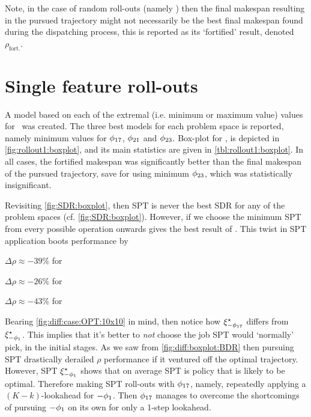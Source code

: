 Note, in the case of random roll-outs (namely \phiRNDRelated) then the final makespan resulting in the pursued trajectory might not necessarily be the best final makespan found during the dispatching process, this is reported as its `fortified' result, denoted $\rho_{\text{fort.}}$. 

\section{Single feature roll-outs}

A model based on each of the extremal (i.e. minimum or maximum value) values 
for \phiGlobalRelated\ was created. The three best models for each problem 
space is reported, namely minimum values for $\phi_{17}$, $\phi_{21}$ and 
$\phi_{23}$. 
Box-plot for \namerho, is depicted in \cref{fig:rollout1:boxplot}, and its 
main statistics are given in \cref{tbl:rollout1:boxplot}.
In all cases, the fortified makespan was significantly better than the final 
makespan of the pursued trajectory, save for  using minimum 
$\phi_{23}$, which was statistically insignificant.

Revisiting \cref{fig:SDR:boxplot}, then SPT is never the best SDR for any of 
the problem spaces (cf. \cref{fig:SDR:boxplot}).
However, if we choose the minimum SPT from every possible operation onwards 
gives the best result of \phiSDRRelated. This twist in SPT application boots 
performance by 
\begin{enumerate*}
    \item $\Delta\rho\approx -39\%$ for 
    \item $\Delta\rho\approx -26\%$ for 
    \item $\Delta\rho\approx -43\%$ for 
\end{enumerate*}
Bearing \cref{fig:diff:case:OPT:10x10} in mind, then notice how 
$\xi^{\star}_{-\phi_{17}}$ differs from $\xi^{\star}_{-\phi_1}$. This implies 
that it's better to \emph{not} choose the job SPT would `normally' pick, in the 
initial stages. As we saw from \cref{fig:diff:boxplot:BDR} then pursuing SPT 
drastically derailed $\rho$ performance if it ventured off the optimal 
trajectory. 
However, SPT $\xi^{\star}_{-\phi_1}$ shows that on average SPT is policy that 
is likely to be optimal. 
Therefore making SPT roll-outs with $\phi_{17}$, namely, repeatedly applying a 
$(K-k)$-lookahead for $-\phi_1$. 
Then $\phi_{17}$ manages to overcome the shortcomings of pursuing $-\phi_1$ on 
its own for only a 1-step lookahead.

